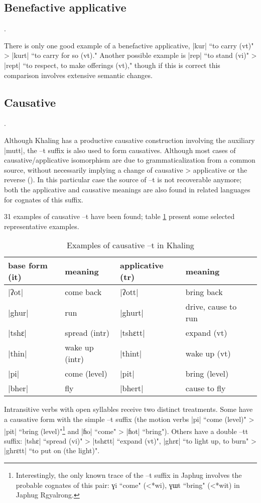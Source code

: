 \documentclass[oldfontcommands,oneside,a4paper,11pt]{article}
\newcommand{\ipa}[1]{{\phon #1}} %
\newcommand{\dhatu}[1]{|\ipa{#1}|}
\begin{document}
\subsection{Benefactive applicative}. 

There is only one good example of a benefactive applicative, \dhatu{kur} ``to carry (vt)" > \dhatu{kurt} ``to carry for so (vt)." Another possible example is \dhatu{rep} ``to stand (vi)" > \dhatu{rept} ``to respect, to make offerings (vt)," though if this is correct this comparison involves extensive semantic changes.

\subsection{Causative}.


Although Khaling has a productive causative construction involving the auxiliary \dhatu{mutt}, the \ipa{--t} suffix is also used to form causatives. Although most cases of causative/applicative isomorphism are due to grammaticalization from a common source, without necessarily implying a change of causative > applicative or the reverse (\citealt[64]{peterson07appl}). In this particular case the source of \ipa{--t} is not recoverable anymore; both the applicative and causative meanings are also found in related languages for cognates of this suffix.

31 examples of causative \ipa{--t} have been found; table \ref{tab:caus} present some selected representative examples.

\begin{table}[H]
\caption{Examples of causative \ipa{--t} in Khaling} \label{tab:caus}
\begin{tabular}{lllll}
\toprule
base form (it) & meaning & applicative (tr) & meaning \\
\midrule
\dhatu{ʔot} & come back & \dhatu{ʔott} &bring back\\
\dhatu{ghur} & run & \dhatu{ghurt} &drive, cause to run\\
\dhatu{tshɛ} & spread (intr) & \dhatu{tshɛtt} & expand (vt)\\
\dhatu{thin} & wake up (intr) & \dhatu{thint} &wake up (vt)\\
\dhatu{pi} & come (level) & \dhatu{pit} &bring (level)\\
\dhatu{bher} & fly & \dhatu{bhert} &cause to fly\\
\bottomrule
\end{tabular}
\end{table}
Intransitive verbs with open syllables receive two distinct treatments. Some have a causative form with the simple \ipa{--t} suffix (the motion verbs \dhatu{pi} ``come (level)" > \dhatu{pit} ``bring (level)"\footnote{Interestingly, the only known trace of the \ipa{--t} suffix in Japhug involves the probable cognates of this pair: \ipa{ɣi} ``come" (<*wi), \ipa{ɣɯt} ``bring" (<*wit) in Japhug Rgyalrong.} and \dhatu{ɦo} ``come" > \dhatu{ɦot} ``bring"). Others have a double \ipa{--tt} suffix: \dhatu{tshɛ} ``spread (vi)" > \dhatu{tshɛtt} ``expand (vt)", \dhatu{ghrɛ} ``to light up, to burn" > \dhatu{ghrɛtt} ``to put on (the light)".
\end{document}
